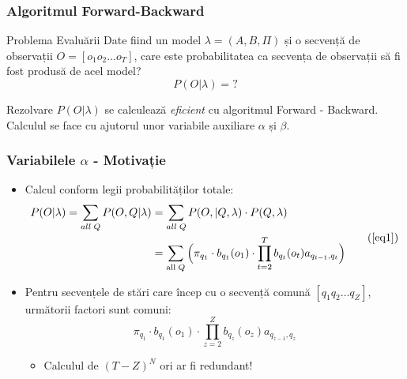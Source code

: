

\begin{frame}
  \frametitle{Algoritmul Forward-Backward}
  \begin{block}{Problema Evaluării}
    Date fiind un model $\lambda = (A, B, \Pi)$ și o secvență de
    observații $O = [o_1 o_2 \ldots o_T]$, care este probabilitatea ca
    secvența de observații să fi fost produsă de acel model?
    \begin{equation}
      \label{eq:pb-evaluarii}
      P(O \vert \lambda) = ?
    \end{equation}
  \end{block}
  \pause
  \begin{block}{Rezolvare}
    $P(O \vert \lambda)$ se calculează \emph{eficient} cu algoritmul
    \alert{Forward - Backward}.\\\vspace*{1em}%
    Calculul se face cu ajutorul unor variabile auxiliare $\alpha$ și $\beta$.
  \end{block}
\end{frame}

\begin{frame}
  \frametitle{Variabilele $\alpha$ - Motivație}
  \begin{itemize}
  \item Calcul conform legii probabilităților totale:
    \begin{equation}
      \begin{split}
        P(O \vert \lambda) = \displaystyle\sum_{all\;Q} P(O, Q \vert
        \lambda) & = \displaystyle\sum_{all\;Q} P(O,\vert Q, \lambda)
        \cdot P(Q, \lambda) \\
        & = \displaystyle\sum_{\text{all}\;Q} \Big( \pi_{q_1} \cdot
        b_{q_1}(o_1) \cdot \displaystyle\prod_{t=2}^{T} b_{q_t}(o_t)
        a_{q_{t-1},q_t} \Big)
      \end{split}
      \tag{\ref{eq1}}
    \end{equation}
  \item Pentru secvențele de stări care încep cu o secvență comună
    $[q_1 q_2 \ldots q_Z]$, următorii factori sunt comuni:
    \begin{equation*}
      \pi_{q_1} \cdot
      b_{q_1}(o_1) \cdot \displaystyle\prod_{z=2}^{Z} b_{q_z}(o_z)
      a_{q_{z-1},q_z}
    \end{equation*}
    \begin{itemize}
    \item Calculul de $(T-Z)^N$ ori ar fi redundant!
    \end{itemize}

  \end{itemize}
\end{frame}


